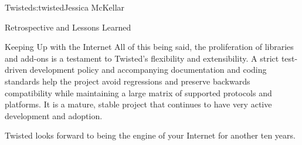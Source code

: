 \begin{aosachapter}{Twisted}{s:twisted}{Jessica McKellar}
\begin{aosasect1}{Retrospective and Lessons Learned}
\begin{aosasect2}{Keeping Up with the Internet}
All of this being said, the proliferation of libraries and add-ons is a
testament to Twisted's flexibility and extensibility. A strict test-driven
development policy and accompanying documentation and coding standards help the
project avoid regressions and preserve backwards compatibility while maintaining
a large matrix of supported protocols and platforms. It is a mature, stable
project that continues to have very active development and adoption.

Twisted looks forward to being the engine of your Internet for another ten
years.

\end{aosasect2}

\end{aosasect1}

\end{aosachapter}
